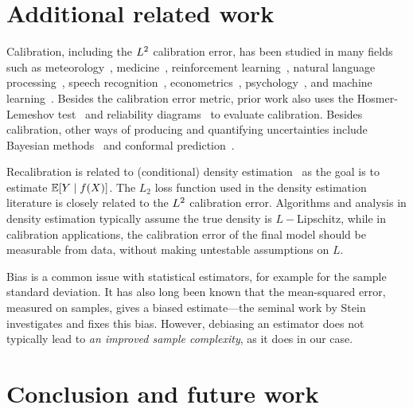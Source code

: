 \section{Additional related work}

Calibration, including the $L^2$ calibration error, has been studied in many fields such as meteorology~\cite{murphy1973vector, murphy1977reliability, degroot1983forecasters,gneiting2005weather, brocker2009decomposition}, medicine~\cite{jiang2012calibrating, crowson2017calibration, harrell1996prognostic}, reinforcement learning~\cite{malik2019calibrated}, natural language processing~\cite{nguyen2015posterior, card2018calibration}, speech recognition~\cite{dong2011calibration}, econometrics~\cite{gneiting2007probabilistic}, psychology~\cite{lichtenstein1982calibration}, and machine learning~\cite{guo2017calibration, zadrozny2001calibrated, kuleshov2018accurate, zadrozny2002transforming, naeini2014binary, hendrycks2019anomaly, hendrycks2019pretraining}. Besides the calibration error metric, prior work also uses the Hosmer-Lemeshov test~\cite{hosmer1980goodness} and reliability diagrams~\cite{degroot1983forecasters, brocker2007reliability} to evaluate calibration. Besides calibration, other ways of producing and quantifying uncertainties include Bayesian methods~\cite{gelman1995bayesian} and conformal prediction~\cite{shafer2008tutorial, lei2016distribution}.

Recalibration is related to (conditional) density estimation~\cite{wasserman2019, parzen1962} as the goal is to estimate $\mathbb{E}[Y \mid f(X)]$.
The $L_2$ loss function used in the density estimation literature is closely related to the $L^2$ calibration error.
Algorithms and analysis in density estimation typically assume the true density is $L-$Lipschitz, while in calibration applications, the calibration error of the final model should be measurable from data, without making untestable assumptions on $L$.


Bias is a common issue with statistical estimators, for example for the sample standard deviation. It has also long been known that the mean-squared error, measured on samples, gives a biased estimate---the seminal work by Stein~\cite{stein81sure} investigates and fixes this bias. However, debiasing an estimator does not typically lead to \emph{an improved sample complexity}, as it does in our case.

\section{Conclusion and future work}

